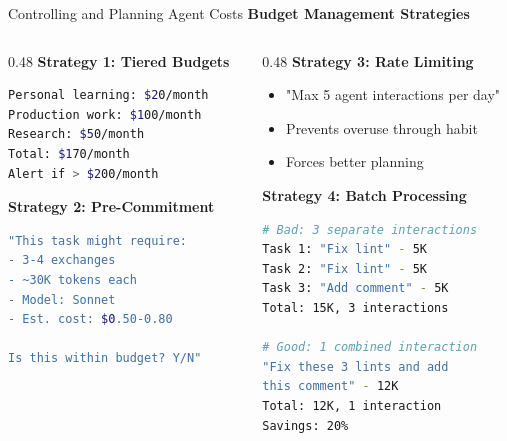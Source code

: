 \documentclass[aspectratio=169,11pt]{beamer}
\begin{document}
\begin{frame}[fragile]{Controlling and Planning Agent Costs}
    \textbf{Budget Management Strategies}

    \begin{columns}[T]
        \begin{column}{0.48\textwidth}
            \textbf{Strategy 1: Tiered Budgets}
            \begin{lstlisting}[language=Bash]
Personal learning: $20/month
Production work: $100/month
Research: $50/month
Total: $170/month
Alert if > $200/month
            \end{lstlisting}

            \textbf{Strategy 2: Pre-Commitment}
            \begin{lstlisting}[language=Bash]
"This task might require:
- 3-4 exchanges
- ~30K tokens each
- Model: Sonnet
- Est. cost: $0.50-0.80

Is this within budget? Y/N"
            \end{lstlisting}
        \end{column}
        \begin{column}{0.48\textwidth}
            \textbf{Strategy 3: Rate Limiting}
            \begin{itemize}
                \item "Max 5 agent interactions per day"
                \item Prevents overuse through habit
                \item Forces better planning
            \end{itemize}

            \textbf{Strategy 4: Batch Processing}
            \begin{lstlisting}[language=Bash]
# Bad: 3 separate interactions
Task 1: "Fix lint" - 5K
Task 2: "Fix lint" - 5K
Task 3: "Add comment" - 5K
Total: 15K, 3 interactions

# Good: 1 combined interaction
"Fix these 3 lints and add
this comment" - 12K
Total: 12K, 1 interaction
Savings: 20%
            \end{lstlisting}
        \end{column}
    \end{columns}
\end{frame}
\end{document}
